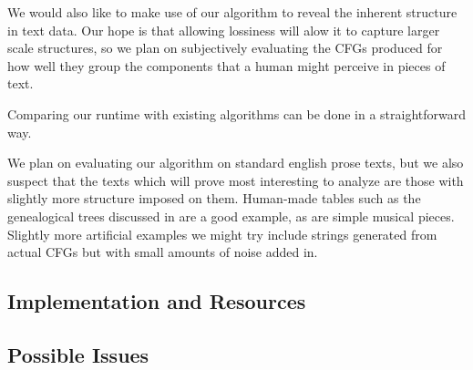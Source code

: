 \documentclass[11pt]{article}
\begin{document}
We would also like to make use of our algorithm to reveal the inherent
structure in text data. Our hope is that allowing lossiness will alow it to
capture larger scale structures, so we plan on subjectively evaluating the CFGs
produced for how well they group the components that a human might perceive in
pieces of text.

Comparing our runtime with existing algorithms can be done in a straightforward
way.

We plan on evaluating our algorithm on standard english prose texts, but we
also suspect that the texts which will prove most interesting to analyze are
those with slightly more structure imposed on them. Human-made tables such as
the genealogical trees discussed in \cite{nevillphd} are a good example, as are
simple musical pieces. Slightly more artificial examples we might try include
strings generated from actual CFGs but with small amounts of noise added in.

\subsection{Implementation and Resources}

\subsection{Possible Issues}

\nocite{*}


\end{document}
